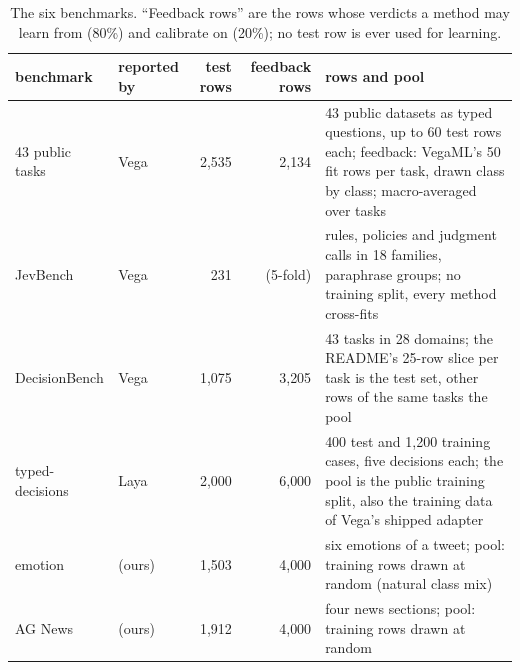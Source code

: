 \begin{table}[t]\centering\small
\caption{The six benchmarks. ``Feedback rows'' are the rows whose verdicts a method may learn from (80\%) and calibrate on (20\%); no test row is ever used for learning.}
\label{tab:bench}
\setlength{\tabcolsep}{4pt}
\begin{tabular}{llrrp{7.4cm}}
\toprule
benchmark & reported by & test rows & feedback rows & rows and pool \\
\midrule
43 public tasks & Vega & 2{,}535 & 2{,}134 & 43 public datasets as typed questions, up to 60 test rows each; feedback: VegaML's 50 fit rows per task, drawn class by class; macro-averaged over tasks \\
JevBench & Vega & 231 & (5-fold) & rules, policies and judgment calls in 18 families, paraphrase groups; no training split, every method cross-fits \\
DecisionBench & Vega & 1{,}075 & 3{,}205 & 43 tasks in 28 domains; the README's 25-row slice per task is the test set, other rows of the same tasks the pool \\
typed-decisions & Laya & 2{,}000 & 6{,}000 & 400 test and 1,200 training cases, five decisions each; the pool is the public training split, also the training data of Vega's shipped adapter \\
emotion & (ours) & 1{,}503 & 4{,}000 & six emotions of a tweet; pool: training rows drawn at random (natural class mix) \\
AG News & (ours) & 1{,}912 & 4{,}000 & four news sections; pool: training rows drawn at random \\
\bottomrule
\end{tabular}
\end{table}
